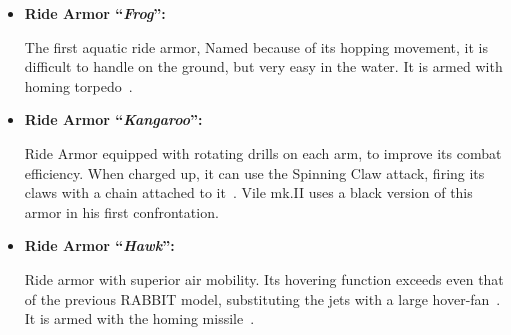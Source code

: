 \begin{itemize}
	\item \hypertarget{vehicle:Ride_Armor_Frog}{\textbf{Ride Armor ``\textit{Frog}'':}} The first aquatic ride armor, Named because of its hopping movement, it is difficult to 
	handle on the ground, but very easy in the water. It is armed with homing torpedo~\cite{wayback:X3_resources}.
	
	\item \hypertarget{vehicle:Ride_Armor_Kangaroo}{\textbf{Ride Armor ``\textit{Kangaroo}'':}} Ride Armor equipped with rotating drills on each arm, to improve its combat efficiency. When charged up, it can use the Spinning Claw attack, firing its claws with a chain attached to it~\cite{wayback:X3_resources,book:MH_field_guide}. Vile mk.II uses a black version of this armor in his first confrontation.
	
	\item \hypertarget{vehicle:Ride_Armor_Hawk}{\textbf{Ride Armor ``\textit{Hawk}'':}} Ride armor with superior air mobility. Its hovering function exceeds even that of the previous RABBIT model, substituting the jets with a large hover-fan~\cite{book:MH_field_guide}. It is armed with the homing missile~\cite{wayback:X3_resources}.
	

\end{itemize}
